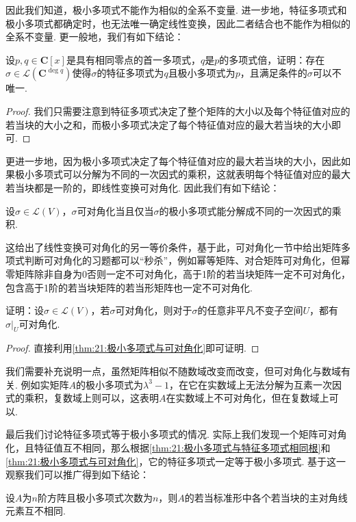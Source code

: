 因此我们知道，极小多项式不能作为相似的全系不变量. 进一步地，特征多项式和极小多项式都确定时，也无法唯一确定线性变换，因此二者结合也不能作为相似的全系不变量. 更一般地，我们有如下结论：
\begin{example}
    设$p,q\in\mathbf{C}[x]$是具有相同零点的首一多项式，$q$是$p$的多项式倍，证明：存在$\sigma\in \mathcal{L}(\mathbf{C}^{\deg q})$使得$\sigma$的特征多项式为$q$且极小多项式为$p$，且满足条件的$\sigma$可以不唯一.
\end{example}
\begin{proof}
    我们只需要注意到特征多项式决定了整个矩阵的大小以及每个特征值对应的若当块的大小之和，而极小多项式决定了每个特征值对应的最大若当块的大小即可.
\end{proof}

更进一步地，因为极小多项式决定了每个特征值对应的最大若当块的大小，因此如果极小多项式可以分解为不同的一次因式的乘积，这就表明每个特征值对应的最大若当块都是一阶的，即线性变换可对角化. 因此我们有如下结论：
\begin{theorem} \label{thm:21:极小多项式与可对角化}
    设$\sigma\in \mathcal{L}(V)$，$\sigma$可对角化当且仅当$\sigma$的极小多项式能分解成不同的一次因式的乘积.
\end{theorem}

这给出了线性变换可对角化的另一等价条件，基于此，可对角化一节中给出矩阵多项式判断可对角化的习题都可以``秒杀''，例如幂等矩阵、对合矩阵可对角化，但幂零矩阵除非自身为0否则一定不可对角化，高于1阶的若当块矩阵一定不可对角化，包含高于1阶的若当块矩阵的若当形矩阵也一定不可对角化.

\begin{example}
    证明：设$\sigma\in \mathcal{L}(V)$，若$\sigma$可对角化，则对于$\sigma$的任意非平凡不变子空间$U$，都有$\sigma\vert_U$可对角化.
\end{example}

\begin{proof}
    直接利用\autoref{thm:21:极小多项式与可对角化}即可证明.
\end{proof}

我们需要补充说明一点，虽然矩阵相似不随数域改变而改变，但可对角化与数域有关. 例如实矩阵$A$的极小多项式为$\lambda^3-1$，在它在实数域上无法分解为互素一次因式的乘积，复数域上则可以，这表明$A$在实数域上不可对角化，但在复数域上可以.

最后我们讨论特征多项式等于极小多项式的情况. 实际上我们发现一个矩阵可对角化，且特征值互不相同，那么根据\autoref{thm:21:极小多项式与特征多项式相同根}和\autoref{thm:21:极小多项式与可对角化}，它的特征多项式一定等于极小多项式. 基于这一观察我们可以推广得到如下结论：
\begin{example}
    设$A$为$n$阶方阵且极小多项式次数为$n$，则$A$的若当标准形中各个若当块的主对角线元素互不相同.
\end{example}

